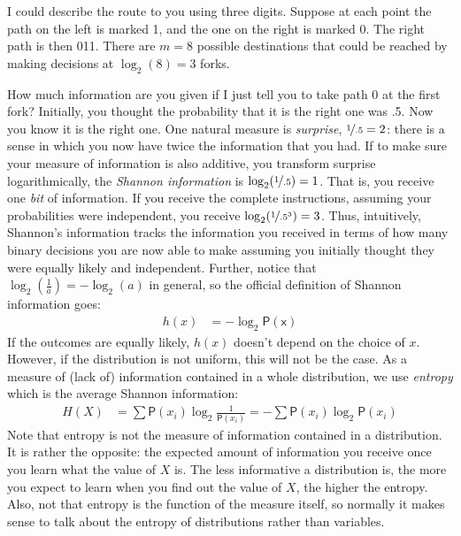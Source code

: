 \documentclass[
  10pt,
  dvipsnames,enabledeprecatedfontcommands]{scrartcl}
\newcommand{\pr}[1]{\mathsf{P}(#1)}
\begin{document}
I could describe the route to you using three digits. Suppose at each
point the path on the left is marked 1, and the one on the right is
marked 0. The right path is then 011. There are \(m=8\) possible
destinations that could be reached by making decisions at
\(\log_2(8)=3\) forks.

How much information are you given if I just tell you to take path 0 at
the first fork? Initially, you thought the probability that it is the
right one was .5. Now you know it is the right one. One natural measure
is \emph{surprise}, \(\nicefrac{1}{.5}=2\): there is a sense in which
you now have twice the information that you had. If to make sure your
measure of information is also additive, you transform surprise
logarithmically, the \emph{Shannon information} is
\(\log_2(\nicefrac{1}{.5})=1\). That is, you receive one \emph{bit} of
information. If you receive the complete instructions, assuming your
probabilities were independent, you receive
\(\log_2(\nicefrac{1}{.5^3})=3\). Thus, intuitively, Shannon's
information tracks the information you received in terms of how many
binary decisions you are now able to make assuming you initially thought
they were equally likely and independent. Further, notice that
\(\log_2(\frac{1}{a})= - \log_2(a)\) in general, so the official
definition of Shannon information goes: \begin{align*}
h(x) & = - \log_2 \mathsf{\pr{x}}
\end{align*} If the outcomes are equally likely, \(h(x)\) doesn't depend
on the choice of \(x\). However, if the distribution is not uniform,
this will not be the case. As a measure of (lack of) information
contained in a whole distribution, we use \emph{entropy} which is the
average Shannon information: \begin{align*}
H(X)  & = \sum \mathsf{P}(x_i) \log_2 \frac{1}{\mathsf{P}(x_i)} =
- \sum \mathsf{P}(x_i) \log_2 \mathsf{P}(x_i)
\end{align*} \noindent Note that entropy is not the measure of
information contained in a distribution. It is rather the opposite: the
expected amount of information you receive once you learn what the value
of \(X\) is. The less informative a distribution is, the more you expect
to learn when you find out the value of \(X\), the higher the entropy.
Also, not that entropy is the function of the measure itself, so
normally it makes sense to talk about the entropy of distributions
rather than variables.
\end{document}
